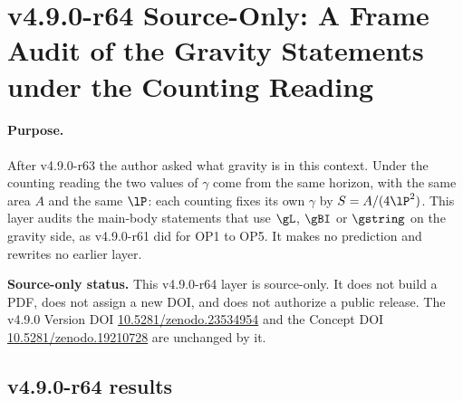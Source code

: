 \clearpage
\section*{v4.9.0-r64 Source-Only: A Frame Audit of the Gravity Statements under the Counting Reading}
\label{sec:v490-r64-gravity-audit}

\paragraph{Purpose.}
After v4.9.0-r63 the author asked what gravity is in this context.  Under the counting reading the two values of \(\gamma\) come from the same horizon, with the same area
\(A\) and the same \(\lP\): each counting fixes its own \(\gamma\) by \(S=A/(4\lP^2)\).  This layer audits the main-body statements that use \(\gL\), \(\gBI\) or \(\gstring\) on the
gravity side, as v4.9.0-r61 did for OP1 to OP5.  It makes no prediction and rewrites no earlier layer.

\noindent\textbf{Source-only status.}
This v4.9.0-r64 layer is source-only.  It does not build a PDF, does not assign a new DOI,
and does not authorize a public release.  The v4.9.0 Version DOI
\href{https://doi.org/10.5281/zenodo.23534954}{10.5281/zenodo.23534954} and the Concept DOI
\href{https://doi.org/10.5281/zenodo.19210728}{10.5281/zenodo.19210728} are unchanged by it.

\subsection*{v4.9.0-r64 results}
\label{subsec:v490-r64-results}

